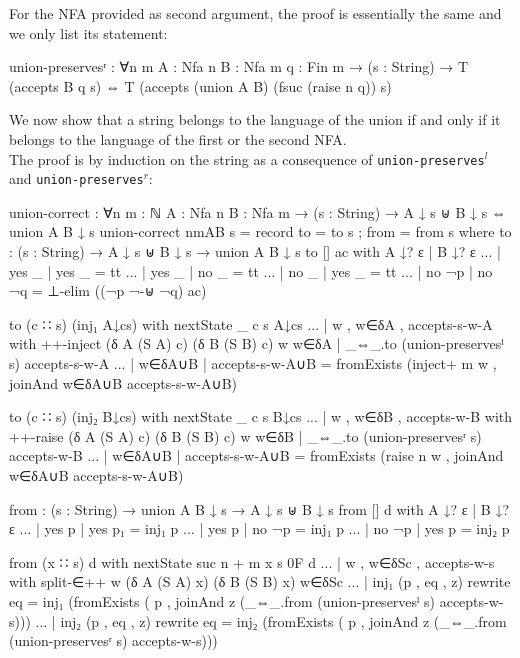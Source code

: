 For the NFA provided as second argument, the proof is essentially the same and we only list its statement:
\begin{agda}
union-preservesʳ : ∀{n m} {A : Nfa n} {B : Nfa m} {q : Fin m}
  → (s : String)
  → T (accepts B q s)
    ⇔
    T (accepts (union A B) (fsuc (raise n q)) s)
\end{agda}
We now show that a string belongs to the language of the union if and only if it belongs to the language of the first or the second NFA.\\
The proof is by induction on the string as a consequence of \texttt{union-preserves$^l$} and \texttt{union-preserves$^r$}:
\begin{agda}
union-correct : ∀{n m : ℕ} {A : Nfa n} {B : Nfa m}
  → (s : String)
  → A ↓ s ⊎ B ↓ s ⇔ union A B ↓ s
union-correct {n}{m}{A}{B} s =
  record { to = to s ; from = from s }
  where
  to : (s : String) → A ↓ s ⊎ B ↓ s → union A B ↓ s
  to [] ac with A ↓? ε | B ↓? ε
  ... | yes _  | yes _ = tt
  ... | yes _  | no  _ = tt
  ... | no  _  | yes _ = tt
  ... | no ¬p  | no ¬q = ⊥-elim ((¬p ¬-⊎ ¬q) ac)

  to (c ∷ s) (inj₁ A↓cs) with nextState {_} {c} {s} A↓cs
  ... | w , w∈δA , accepts-s-w-A
                with ++-inject (δ A (S A) c) (δ B (S B) c) w w∈δA
                   | _⇔_.to (union-preservesˡ s) accepts-s-w-A
  ... | w∈δA∪B | accepts-s-w-A∪B
    = fromExists (inject+ m w , joinAnd w∈δA∪B accepts-s-w-A∪B)

  to (c ∷ s) (inj₂ B↓cs) with nextState {_} {c} {s} B↓cs
  ... | w , w∈δB , accepts-w-B
                with ++-raise (δ A (S A) c) (δ B (S B) c) w w∈δB
                   | _⇔_.to (union-preservesʳ s) accepts-w-B
  ... | w∈δA∪B | accepts-s-w-A∪B
    = fromExists (raise n w , joinAnd w∈δA∪B accepts-s-w-A∪B)


  from : (s : String) → union A B ↓ s → A ↓ s ⊎ B ↓ s
  from [] d with A ↓? ε | B ↓? ε
  ... | yes p | yes p₁ = inj₁ p
  ... | yes p | no ¬p  = inj₁ p
  ... | no ¬p | yes p  = inj₂ p

  from (x ∷ s) d with nextState {suc n + m} {x} {s} {0F} d
  ... | w , w∈δSc , accepts-w-s 
    with split-∈++ w (δ A (S A) x) (δ B (S B) x) w∈δSc
  ... | inj₁ (p , eq , z) rewrite eq =
    inj₁ (fromExists (
      p , joinAnd z (_⇔_.from (union-preservesˡ s) accepts-w-s)))
  ... | inj₂ (p , eq , z) rewrite eq =
    inj₂ (fromExists (
      p , joinAnd z (_⇔_.from (union-preservesʳ s) accepts-w-s)))
\end{agda}
